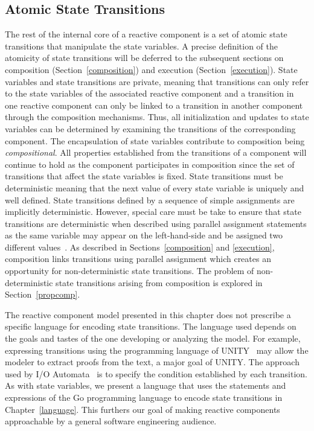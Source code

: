 \subsection{Atomic State Transitions}
The rest of the internal core of a reactive component is a set of atomic state transitions that manipulate the state variables.
A precise definition of the atomicity of state transitions will be deferred to the subsequent sections on composition (Section~\ref{composition}) and execution (Section~\ref{execution}).
State variables and state transitions are private, meaning that transitions can only refer to the state variables of the associated reactive component and a transition in one reactive component can only be linked to a transition in another component through the composition mechanisms.
Thus, all initialization and updates to state variables can be determined by examining the transitions of the corresponding component.
The encapsulation of state variables contribute to composition being \emph{compositional}.
All properties established from the transitions of a component will continue to hold as the component participates in composition since the set of transitions that affect the state variables is fixed.
State transitions must be deterministic meaning that the next value of every state variable is uniquely and well defined.
State transitions defined by a sequence of simple assignments are implicitly deterministic.
However, special care must be take to ensure that state transitions are deterministic when described using parallel assignment statements as the same variable may appear on the left-hand-side and be assigned two different values~\cite{chandy1989parallel}.
As described in Sections~\ref{composition} and \ref{execution}, composition links transitions using parallel assignment which creates an opportunity for non-deterministic state transitions.
The problem of non-deterministic state transitions arising from composition is explored in Section~\ref{propcomp}.

The reactive component model presented in this chapter does not prescribe a specific language for encoding state transitions.
The language used depends on the goals and tastes of the one developing or analyzing the model.
For example, expressing transitions using the programming language of UNITY~\cite{chandy1989parallel} may allow the modeler to extract proofs from the text, a major goal of UNITY.
The approach used by I/O Automata~\cite{nancy1996distributed} is to specify the condition established by each transition.
As with state variables, we present a language that uses the statements and expressions of the Go programming language to encode state transitions in Chapter~\ref{language}.
This furthers our goal of making reactive components approachable by a general software engineering audience.

